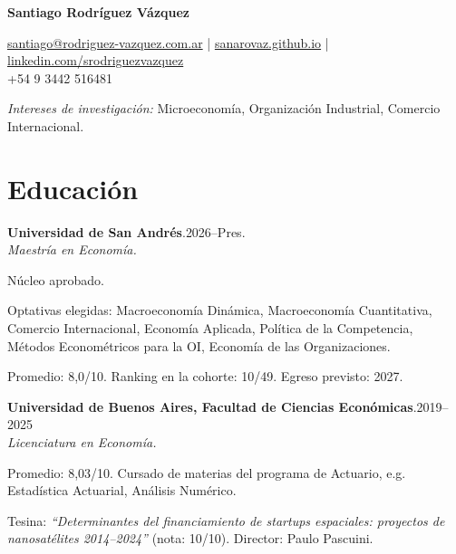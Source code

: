 \documentclass[11pt]{article}
\newcommand{\cvname}{Santiago Rodríguez Vázquez}
\newcommand{\entrydate}[1]{\hfill{\small{#1}}}
\begin{document}
\thispagestyle{firstpage}

{\LARGE\bfseries {\cvname}}

\href{mailto:santiago@rodriguez-vazquez.com.ar}{santiago@rodriguez-vazquez.com.ar} | \href{https://sanarovaz.github.io}{sanarovaz.github.io} | \href{https://www.linkedin.com/in/srodriguezvazquez/}{linkedin.com/srodriguezvazquez}
\\
+54 9 3442 516481

{\small \textit{Intereses de investigación:} Microeconomía, Organización Industrial, Comercio Internacional.}

\section{Educación}
\textbf{Universidad de San Andrés}.\entrydate{2026--Pres.}\\
\textit{Maestría en Economía.}
\begin{cvitems}
  \item Núcleo aprobado.
  \item Optativas elegidas: Macroeconomía Dinámica, Macroeconomía Cuantitativa, Comercio Internacional, Economía Aplicada, Política de la Competencia, Métodos Econométricos para la OI, Economía de las Organizaciones.
  \item Promedio: 8,0/10. Ranking en la cohorte: 10/49. Egreso previsto: 2027.
  \end{cvitems}

\smallskip
\textbf{Universidad de Buenos Aires, Facultad de Ciencias Económicas}.\entrydate{2019--2025}\\
\textit{Licenciatura en Economía.}
\begin{cvitems}
  \item Promedio: 8,03/10. Cursado de materias del programa de Actuario, e.g. Estadística Actuarial,
        Análisis Numérico.
  \item Tesina: \emph{``Determinantes del financiamiento de startups espaciales:
        proyectos de nanosatélites 2014--2024''} (nota: 10/10). Director: Paulo Pascuini.
\end{cvitems}

\end{document}
